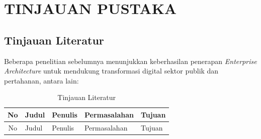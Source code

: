 \cleardoublepage %
\chapter{TINJAUAN PUSTAKA}
\label{chap:tinjauan-pustaka}
\section{Tinjauan Literatur}
Beberapa penelitian sebelumnya menunjukkan keberhasilan penerapan \textit{Enterprise Architecture} untuk mendukung transformasi digital sektor publik dan pertahanan, antara lain:
\begin{longtable}{|c|p{3cm}|p{3cm}|p{3cm}|p{3cm}|}
\caption{Tinjauan Literatur} \\
\hline
No & Judul & Penulis & Permasalahan & Tujuan \\
\hline
\endfirsthead

\hline
No & Judul & Penulis & Permasalahan & Tujuan \\
\hline
\endhead


\end{longtable}
